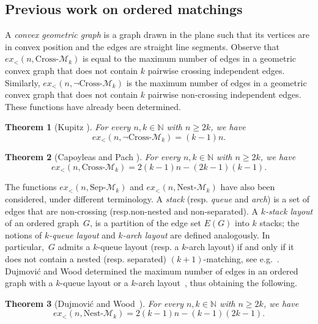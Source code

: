 \documentclass[11pt]{article}
\newtheorem{theorem}{Theorem}[section]
\theoremstyle{definition}
\begin{document}
\subsection{Previous work on ordered matchings}
A {\em convex geometric graph} is a graph drawn in the plane such that its vertices are in convex position and the edges are straight line segments.
Observe  that $ex_<(n,\text{Cross-}\mathcal M_k)$ is equal to the maximum number of edges in a geometric convex graph that does not contain $k$ pairwise crossing independent edges. 
Similarly, $ex_<(n,\neg\text{Cross-}\mathcal M_k)$ is the maximum number of edges in a geometric convex graph that  
does not contain $k$ pairwise non-crossing independent edges.
These functions have already been determined.


\begin{theorem}[Kupitz \cite{Kupitz}]
For every $n,k\in\mathbb N$ with $n\ge 2k$, we have 
$$ex_<(n,\neg\text{Cross-}\mathcal M_k)=(k-1)n.$$    
\end{theorem}

\begin{theorem}[Capoyleas and Pach \cite{CapoyleasP}]\label{thm:crossing}
For every $n,k\in\mathbb N$ with $n\ge 2k$, we have
$$ex_<(n,\text{Cross-}\mathcal M_k)=2(k-1)n-(2k-1)(k-1).$$    
\end{theorem}

The functions $ex_<(n,\text{Sep-}\mathcal M_k)$ and $ex_<(n,\text{Nest-}\mathcal M_k)$ have also been considered, under different terminology.
A {\it stack} (resp. {\it queue} and {\it arch}) is a set of edges that are non-crossing (resp.non-nested and non-separated).
A {\it $k$-stack layout} of an ordered graph~$G$, is a partition of the edge set $E(G)$ into $k$ stacks; the notions of {\it $k$-queue layout} and {\it $k$-arch layout} are defined analogously.
In particular,~$G$ admits a $k$-queue layout (resp. a $k$-arch layout) if and only if it does not contain a nested (resp. separated) $(k+1)$-matching, see e.g.~\cite[Lemmata~1 and~2]{layout}. 
Dujmovi\'c and Wood \cite{layout} determined the maximum number of edges in an ordered graph with a $k$-queue layout or a $k$-arch layout~\cite[Lemmata~8 and~10]{layout}, thus obtaining the following.

\begin{theorem}[Dujmovi\'c and Wood~\cite{layout}]\label{thm:nested}
For every $n,k\in\mathbb N$ with $n\ge 2k$, we have
$$ex_<(n,\text{Nest-}\mathcal M_k)=2(k-1)n - (k-1)(2k - 1).$$    
\end{theorem}
\end{document}
